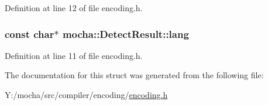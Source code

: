 Definition at line 12 of file encoding.h.

\hypertarget{structmocha_1_1_detect_result_abab885a4ef4ea3536b624f0cfd12cc80}{
\subsubsection[{lang}]{\setlength{\rightskip}{0pt plus 5cm}const char$\ast$ {\bf mocha::DetectResult::lang}}}
\label{structmocha_1_1_detect_result_abab885a4ef4ea3536b624f0cfd12cc80}


Definition at line 11 of file encoding.h.



The documentation for this struct was generated from the following file:\begin{DoxyCompactItemize}
\item 
Y:/mocha/src/compiler/encoding/\hyperlink{encoding_8h}{encoding.h}\end{DoxyCompactItemize}
